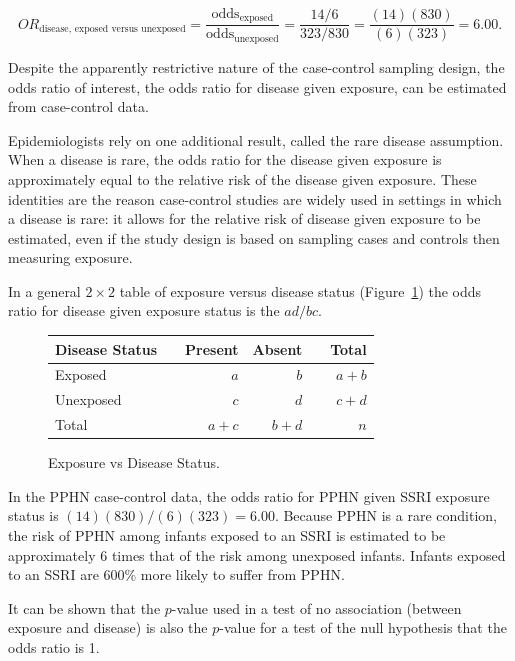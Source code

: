 \[OR_{\text{disease, exposed versus unexposed}} = \frac{\text{odds$_\text{exposed}$}}{\text{odds$_\text{unexposed}$}} = \frac{14/6}{323/830} = \frac{(14)(830)}{(6)(323)} = 6.00. \]

Despite the apparently restrictive nature of the case-control sampling design, the odds ratio of interest, the odds ratio for disease given exposure, can be estimated from case-control data.

Epidemiologists rely on one additional result, called the rare disease assumption. When a disease is rare, the odds ratio for the disease given exposure is approximately equal to the relative risk of the disease given exposure.  These identities are the reason case-control studies are widely used in settings in which a disease is rare: it allows for the relative risk of disease given exposure to be estimated, even if the study design is based on sampling cases and controls then measuring exposure.

In a general $2 \times 2$ table of exposure versus disease status (Figure~\ref{generalTwoByTwoTable}) the odds ratio for disease given exposure status is the $ad/bc$.
 \begin{figure}[h]
	\centering
	\begin{tabular}{ll rrr r}
		\hline
		Disease Status  & \hspace{2mm} & Present & Absent & \hspace{2mm} & Total \\
		\hline
		Exposed &	& $a$ & $b$ &  & $a + b$  \\
		Unexposed & & $c$ & $d$ &  & $c + d $  \\
        Total & & $a + c$ & $b + d$ & & $n$ \\
		\hline
	\end{tabular}
    \caption{Exposure vs Disease Status.}
    \label{generalTwoByTwoTable}
\end{figure}	

In the PPHN case-control data, the odds ratio for PPHN given SSRI exposure status is $(14)(830)/(6)(323) = 6.00$.  Because PPHN is a rare condition, the risk of PPHN among infants exposed to an SSRI is estimated to be approximately 6 times that of the risk among unexposed infants.  Infants exposed to an SSRI are 600\% more likely to suffer from PPHN.  

It can be shown that the $p$-value used in a test of no association (between exposure and disease) is also the $p$-value for a test of the null hypothesis that the odds ratio is 1.

